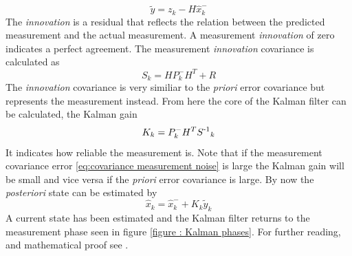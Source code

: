 \documentclass[a4paper,11pt]{kth-mag}
\begin{document}
\begin{equation}
\tilde{y} = z_k - H\hat{x}^-_k
\end{equation}
The \textit{innovation} is a residual that reflects the relation between the predicted measurement and the actual measurement. A measurement \textit{innovation} of zero indicates a perfect agreement.
The measurement \textit{innovation} covariance is calculated as
\begin{equation}
S_k = HP^-_kH^T + R
\end{equation}
The \textit{innovation} covariance is very similiar to the \textit{priori} error covariance but represents the measurement instead. From here the core of the Kalman filter can be calculated, the Kalman gain
\begin{equation}
K_k = P^-_kH^TS\textsuperscript{-1}_k
\end{equation}
It indicates how reliable the measurement is. Note that if the measurement covariance error \eqref{eq:covariance measurement noise} is large the Kalman gain will be small and vice versa if the \textit{priori} error covariance is large.
By now the \textit{posteriori} state can be estimated by
\begin{equation}
\hat{x}_k = \hat{x}^-_k + K_k\tilde{y}_k
\end{equation}
A current state has been estimated and the Kalman filter returns to the measurement phase seen in figure \ref{figure : Kalman phases}.
For further reading, and mathematical proof see \cite{Kalmanintro}.
\end{document}
